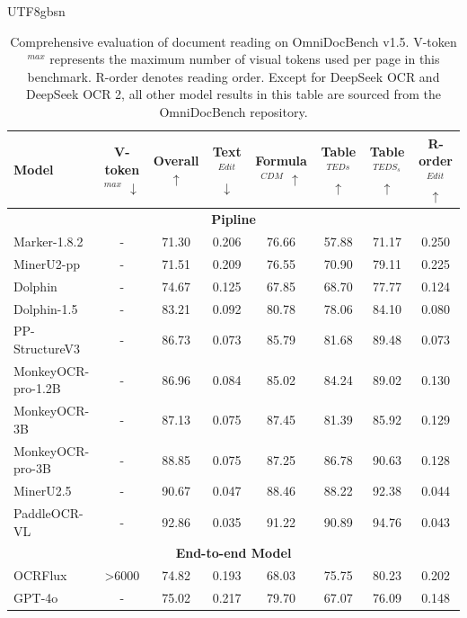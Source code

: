 \documentclass[11pt, a4paper, logo, copyright, nonumbering]{deepseek}
\begin{document}
\begin{CJK*}{UTF8}{gbsn}
\begin{table}[h]
\footnotesize
\caption{Comprehensive evaluation of document reading on OmniDocBench v1.5. V-token$^{max}$ represents the maximum number of visual tokens used per page in this benchmark. R-order denotes reading order. Except for DeepSeek OCR and DeepSeek OCR 2, all other model results in this table are sourced from the OmniDocBench repository. }
\label{tab:omnidocbench}
\centering
\setlength{\tabcolsep}{1.6pt}
{
\begin{tabular}{l|c|c|ccccc}
\toprule[.9pt]
{\textbf{Model}} & V-token$^{max}$ $\downarrow$ & Overall $\uparrow$ & Text$^{Edit}$ $\downarrow$  &  Formula$^{CDM}$ $\uparrow$ & Table$^{TEDs}$ $\uparrow$ & Table$^{TEDS_s}$ $\uparrow$ & R-order$^{Edit}$ $\uparrow$  \\  
\midrule  
\multicolumn{8}{c}{\textbf{  Pipline}} \\ 
\midrule 
Marker-1.8.2~\cite{marker} & - & 71.30 & 0.206 & 76.66 & 57.88 & 71.17 & 0.250 \\
MinerU2-pp~\cite{wang2024mineru} & - & 71.51 & 0.209 & 76.55 & 70.90  & 79.11 & 0.225\\ 
Dolphin~\cite{feng2025dolphin} & - & 74.67 & 0.125 & 67.85 & 68.70  & 77.77 & 0.124\\ 
Dolphin-1.5~\cite{feng2025dolphin} & - & 83.21 & 0.092 & 80.78 & 78.06  & 84.10 & 0.080\\ 
PP-StructureV3~\cite{cui2025paddleocr} & - & 86.73 & 0.073 & 85.79 & 81.68 & 89.48 & 0.073 \\ 
MonkeyOCR-pro-1.2B~\cite{li2025monkeyocr} & - & 86.96 & 0.084 & 85.02 & 84.24 & 89.02 & 0.130 \\ 
MonkeyOCR-3B~\cite{li2025monkeyocr} & - & 87.13 & 0.075 & 87.45 & 81.39 & 85.92 & 0.129 \\ 
MonkeyOCR-pro-3B~\cite{li2025monkeyocr} & - & 88.85 & 0.075 & 87.25 & 86.78 & 90.63 & 0.128 \\ 
MinerU2.5~\cite{wang2024mineru} & - & 90.67 & 0.047 & 88.46 & 88.22 & 92.38 & 0.044 \\ 
PaddleOCR-VL~\cite{cui2025paddleocrvl} & - & 92.86 & 0.035 & 91.22 & 90.89 & 94.76 & 0.043 \\ 
\midrule 
\multicolumn{8}{c}{\textbf{    End-to-end Model}} \\ 
\midrule 
OCRFlux~\cite{ocrflux} & >6000 & 74.82 & 0.193 & 68.03 & 75.75 & 80.23 & 0.202 \\
GPT-4o~\cite{GPT4} & - & 75.02 & 0.217 & 79.70 & 67.07 & 76.09 & 0.148 \\

\end{tabular}}
\end{table}
\end{CJK*}
\end{document}
